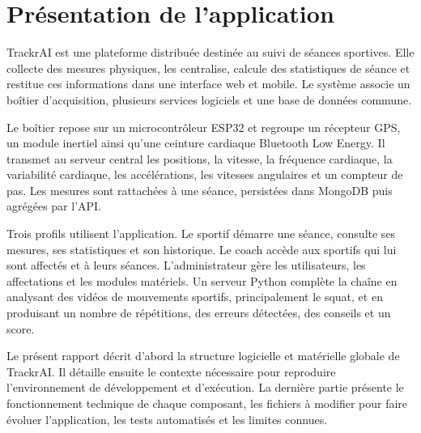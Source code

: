 \documentclass[11pt,a4paper]{article}
\begin{document}
\clearpage
\thispagestyle{empty}
\mbox{}
\clearpage

\hypersetup{pageanchor=true}
\pagestyle{empty}
\begingroup
  \makeatletter
  \let\ps@plain\ps@empty
  \makeatother
  \tableofcontents
\endgroup
\clearpage

\pagestyle{fancy}

{}
\section*{Présentation de l'application}
\label{sec:presentation}

TrackrAI est une plateforme distribuée destinée au suivi de séances sportives. Elle collecte des mesures physiques, les centralise, calcule des statistiques de séance et restitue ces informations dans une interface web et mobile. Le système associe un boîtier d'acquisition, plusieurs services logiciels et une base de données commune.

Le boîtier repose sur un microcontrôleur ESP32 et regroupe un récepteur GPS, un module inertiel ainsi qu'une ceinture cardiaque Bluetooth Low Energy. Il transmet au serveur central les positions, la vitesse, la fréquence cardiaque, la variabilité cardiaque, les accélérations, les vitesses angulaires et un compteur de pas. Les mesures sont rattachées à une séance, persistées dans MongoDB puis agrégées par l'API.

Trois profils utilisent l'application. Le sportif démarre une séance, consulte ses mesures, ses statistiques et son historique. Le coach accède aux sportifs qui lui sont affectés et à leurs séances. L'administrateur gère les utilisateurs, les affectations et les modules matériels. Un serveur Python complète la chaîne en analysant des vidéos de mouvements sportifs, principalement le squat, et en produisant un nombre de répétitions, des erreurs détectées, des conseils et un score.

Le présent rapport décrit d'abord la structure logicielle et matérielle globale de TrackrAI. Il détaille ensuite le contexte nécessaire pour reproduire l'environnement de développement et d'exécution. La dernière partie présente le fonctionnement technique de chaque composant, les fichiers à modifier pour faire évoluer l'application, les tests automatisés et les limites connues.
\end{document}

